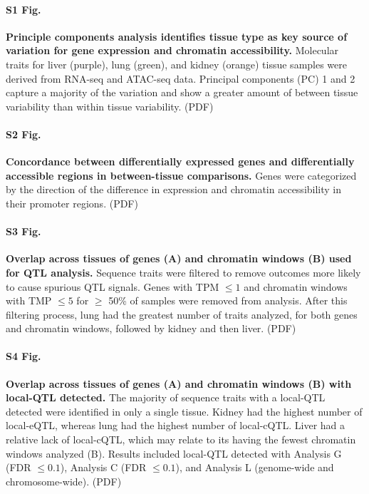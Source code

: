 \documentclass[10pt,letterpaper]{article}
\begin{document}
\paragraph*{S1 Fig.}
\label{S_pca}
{\bf Principle components analysis identifies tissue type as key source of variation for gene expression and chromatin accessibility.} 
Molecular traits for liver (purple), lung (green), and kidney (orange) tissue samples were derived from RNA-seq and ATAC-seq data. Principal components (PC) 1 and 2 capture a majority of the variation and show a greater amount of between tissue variability than within tissue variability. (PDF)

\paragraph*{S2 Fig.}
\label{S_de_concordance}
{\bf Concordance between differentially expressed genes and differentially accessible regions in between-tissue comparisons.} 
Genes were categorized by the direction of the difference in expression and chromatin accessibility in their promoter regions. (PDF)

\paragraph*{S3 Fig.}
\label{S_upset_outcomes}
{\bf Overlap across tissues of genes (A) and chromatin windows (B) used for QTL analysis.} 
Sequence traits were filtered to remove outcomes more likely to cause spurious QTL signals. Genes with TPM $\le 1$ and chromatin windows with TMP $\le 5$ for $\ge$ 50\% of samples were removed from analysis. After this filtering process, lung had the greatest number of traits analyzed, for both genes and chromatin windows, followed by kidney and then liver. (PDF)

\paragraph*{S4 Fig.}
\label{S_upset_qtl}
{\bf Overlap across tissues of genes (A) and chromatin windows (B) with local-QTL detected.} 
The majority of sequence traits with a local-QTL detected were identified in only a single tissue. Kidney had the highest number of local-eQTL, whereas lung had the highest number of local-cQTL. Liver had a relative lack of local-cQTL, which may relate to its having the fewest chromatin windows analyzed (B). Results included local-QTL detected with Analysis G (FDR $\le 0.1$), Analysis C (FDR $\le 0.1$), and Analysis L (genome-wide and chromosome-wide). (PDF)
\end{document}
